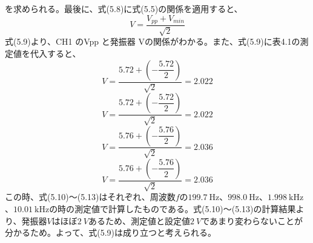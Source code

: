\documentclass[12pt,a4paper]{jsarticle}
\numberwithin{equation}{section}
\numberwithin{figure}{section}
\numberwithin{table}{section}
\begin{document}
\begin{itemize}
						を求められる。最後に、式(5.8)に式(5.5)の関係を適用すると、
						\begin{equation}
							V=\dfrac{V_{pp}+V_{min}}{\sqrt{2}}
						\end{equation}
						式(5.9)より、CH1 のVpp と発振器 Vの関係がわかる。また、式(5.9)に表4.1の測定値を代入すると、
						\begin{equation}
							V=\dfrac{5.72+(- \dfrac{5.72}{2})}{\sqrt{2}}=2.022
						\end{equation}
						\begin{equation}
							V=\dfrac{5.72+(- \dfrac{5.72}{2})}{\sqrt{2}}=2.022
						\end{equation}
						\begin{equation}
							V=\dfrac{5.76+(- \dfrac{5.76}{2})}{\sqrt{2}}=2.036
						\end{equation}
						\begin{equation}
							V=\dfrac{5.76+(- \dfrac{5.76}{2})}{\sqrt{2}}=2.036
						\end{equation}
						この時、式(5.10)～(5.13)はそれぞれ、周波数$f$の$\SI{199.7}{\hertz}$、$\SI{998.0}{\hertz}$、$\SI{1.998}{\kilo\hertz}$、$\SI{10.01}{\kilo\hertz}$の時の測定値で計算したものである。式(5.10)～(5.13)の計算結果より、発振器$V$はほぼ$\SI{2}{V}$あるため、測定値と設定値$\SI{2}{V}$であまり変わらないことが分かるため。よって、式(5.9)は成り立つと考えられる。



\end{itemize}
\end{document}
